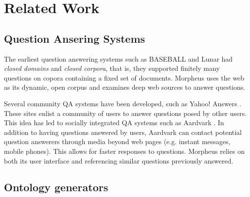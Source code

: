 \section{Related Work}
\label{sec:relatedwork}

\subsection{Question Ansering Systems} 

The earliest question answering systems such as BASEBALL \cite{Green1961} and Lunar \cite{woods1973} had \emph{closed domains} and \emph{closed corpora}, that is, they supported finitely many questions on copora containing a fixed set of documents.
Morpheus uses the web as its dynamic, open corpus and examines deep web sources 
to answer questions.

Several community QA systems have been developed, such as Yahoo! Answers \cite{yahooanswers2008}. These sites enlist a community of users to answer questions posed by other users.  This idea has led to socially integrated QA systems such as Aardvark \cite{vark2010}. In addition to having questions answered by users, Aardvark can contact potential question answerers through media beyond web pages (e.g. instant messages, mobile phones).  This allows for faster responses to questions.  Morpheus relies on both its user interface and referencing similar questions previously answered.

\subsection{Ontology generators} 
\label{sec:ontology_generators}





